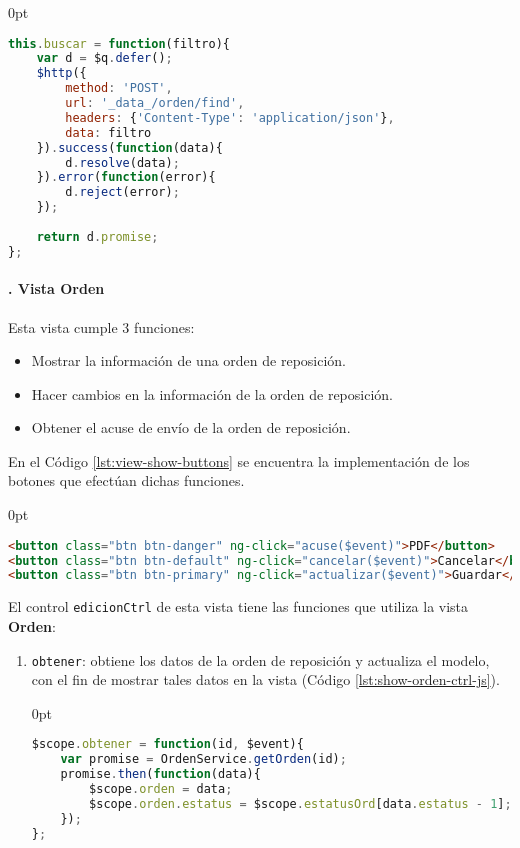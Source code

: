 \begin{enumerate}
\pagebreak

\begin{adjustwidth}{\listingfixwidth}{0pt}
\begin{lstlisting}[language=Javascript, caption={Servicio de \textit{AngularJS} para buscar órdenes de reposición.}, captionpos=b, label={lst:search-service-js}]
this.buscar = function(filtro){
	var d = $q.defer();
	$http({
		method: 'POST',
		url: '_data_/orden/find',
		headers: {'Content-Type': 'application/json'},
		data: filtro
	}).success(function(data){
		d.resolve(data);
	}).error(function(error){
		d.reject(error);
	});
	
	return d.promise;
};
\end{lstlisting}
\end{adjustwidth}

\paragraph{. Vista Orden\\}
Esta vista cumple 3 funciones:
\begin{itemize}
	\item Mostrar la información de una orden de reposición.
	\item Hacer cambios en la información de la orden de reposición.
	\item Obtener el acuse de envío de la orden de reposición.
\end{itemize}
En el Código \ref{lst:view-show-buttons} se encuentra la implementación de los botones que efectúan dichas funciones. 
\begin{adjustwidth}{\listingfixwidth}{0pt}
\begin{lstlisting}[language=HTML, captionpos=b, caption={Controles de la vista de orden de reposición.}, label={lst:view-show-buttons}]
<button class="btn btn-danger" ng-click="acuse($event)">PDF</button>
<button class="btn btn-default" ng-click="cancelar($event)">Cancelar</button>
<button class="btn btn-primary" ng-click="actualizar($event)">Guardar</button>
\end{lstlisting}
\end{adjustwidth}

El control \texttt{edicionCtrl} de esta vista tiene las funciones que utiliza la vista \textbf{Orden}:
\begin{enumerate}
	\item \texttt{obtener}: obtiene los datos de la orden de reposición y actualiza el modelo, con el fin de mostrar tales datos en la vista (Código \ref{lst:show-orden-ctrl-js}).
\begin{adjustwidth}{\listingfixlargewidth}{0pt}
\begin{lstlisting}[language=Javascript, caption={Función del controlador para llenar los datos de la vista de orden de reposición.}, captionpos=b, label={lst:show-orden-ctrl-js}]
$scope.obtener = function(id, $event){
	var promise = OrdenService.getOrden(id);
	promise.then(function(data){
		$scope.orden = data;
		$scope.orden.estatus = $scope.estatusOrd[data.estatus - 1];
	});
};
\end{lstlisting}
\end{adjustwidth}


\end{enumerate}
\end{enumerate}
